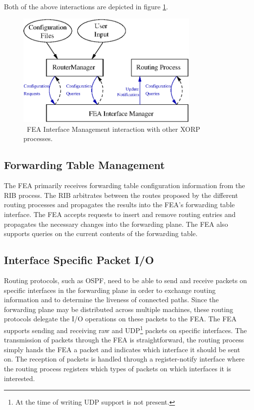 \documentclass[11pt]{article}
\begin{document}
Both of the above interactions are depicted in figure \ref{fig:ifmgmt}.

\begin{figure}
\centerline{\includegraphics[width=0.80\textwidth]{figs/ifmgmt}}
\caption{\label{fig:ifmgmt} \
FEA Interface Management interaction with other XORP processes. \
}
\end{figure}

\subsection{Forwarding Table Management}

The FEA primarily receives forwarding table configuration information from the
RIB process.  The RIB arbitrates between the routes proposed by the
different routing processes and propagates the results into the FEA's
forwarding table interface.  The FEA accepts requests to insert and
remove routing entries and propagates the necessary changes into the
forwarding plane.  The FEA also supports queries on the current
contents of the forwarding table.

\subsection{Interface Specific Packet I/O}

Routing protocols, such as OSPF, need to be able to send and receive
packets on specific interfaces in the forwarding plane in order to
exchange routing information and to determine the liveness of
connected paths.  Since the forwarding plane may be distributed across
multiple machines, these routing protocols delegate the I/O operations
on these packets to the FEA.  The FEA supports sending and receiving
raw and UDP\footnote{At the time of writing UDP support is not
present.}  packets on specific interfaces.  The transmission of
packets through the FEA is straightforward, the routing process simply
hands the FEA a packet and indicates which interface it should be sent
on.  The reception of packets is handled through a register-notify
interface where the routing process registers which types of packets
on which interfaces it is interested.
\end{document}
